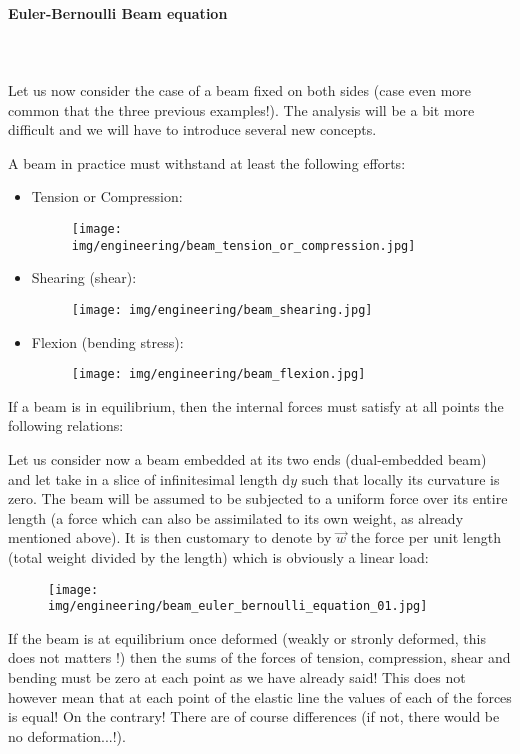 	\paragraph{Euler-Bernoulli Beam equation}\mbox{}\\\\
	Let us now consider the case of a beam fixed on both sides (case even more common that the three previous examples!). The analysis will be a bit more difficult and we will have to introduce several new concepts.

	A beam in practice must withstand at least the following efforts:
	\begin{itemize}
		\item Tension or Compression:
		\begin{figure}[H]
			\centering
			\texttt{[image: img/engineering/beam\_tension\_or\_compression.jpg]}
		\end{figure}
		
		\item Shearing (shear):
		\begin{figure}[H]
			\centering
			\texttt{[image: img/engineering/beam\_shearing.jpg]}
		\end{figure}

		\item Flexion (bending stress):
		\begin{figure}[H]
			\centering
			\texttt{[image: img/engineering/beam\_flexion.jpg]}
		\end{figure}
	\end{itemize}
	If a beam is in equilibrium, then the internal forces must satisfy at all points the following relations:
	
	Let us consider now a beam embedded at its two ends (dual-embedded beam) and let take in a slice of infinitesimal length $\mathrm{d}y$ such that locally its curvature is zero. The beam will be assumed to be subjected to a uniform force over its entire length (a force which can also be assimilated to its own weight, as already mentioned above). It is then customary to denote by $\vec{w}$ the force per unit length (total weight divided by the length) which is obviously a linear load:
	\begin{figure}[H]
		\centering
		\texttt{[image: img/engineering/beam\_euler\_bernoulli\_equation\_01.jpg]}
	\end{figure}
	If the beam is at equilibrium once deformed (weakly or stronly deformed, this does not matters !) then the sums of the forces of tension, compression, shear and bending must be zero at each point as we have already said! This does not however mean that at each point of the elastic line the values of each of the forces is equal! On the contrary! There are of course differences (if not, there would be no deformation...!).

